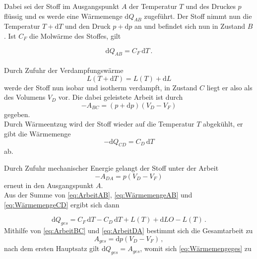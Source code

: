 Dabei sei der Stoff im Ausgangspunkt $A$ der Temperatur $T$ und des Druckes $p$ flüssig und es werde eine Wärmemenge $\mathrm{d}Q_{AB}$ zugeführt.
Der Stoff nimmt nun die Temperatur $T + \mathrm{d}T$ und den Druck $p + \mathrm{d}p$ an und befindet sich nun in Zustand $B$.
Ist $C_F$ die Molwärme des Stoffes, gilt

\begin{equation}
    \mathrm{d}Q_{AB} = C_F \, \mathrm{d}T \,.
    \label{eq:ArbeitAB}
\end{equation}\\

Durch Zufuhr der Verdampfungswärme
\begin{equation}
    L(T + \mathrm{d}T) = L(T) + \mathrm{d}L
    \label{eq:WärmemengeAB}
\end{equation}
werde der Stoff nun isobar und isotherm verdampft, in Zustand $C$ liegt er also als des Volumens $V_D$ vor.
Die dabei geleistete Arbeit ist durch
\begin{equation}
    -A_{BC} = (p + \mathrm{d}p)(V_D - V_F)
    \label{eq:ArbeitBC}
\end{equation}
gegeben. \\

Durch Wärmeentzug wird der Stoff wieder auf die Temperatur $T$ abgekühlt, er gibt die Wärmemenge
\begin{equation}
    -\mathrm{d}Q_{CD} = C_D \,\mathrm{d}T
    \label{eq:WärmemengeCD}
\end{equation}
ab.

Durch Zufuhr mechanischer Energie gelangt der Stoff unter der Arbeit
\begin{equation}
    -A_{DA} = p (V_D - V_F)
    \label{eq:ArbeitDA}
\end{equation} 
erneut in den Ausgangspunkt $A$. \\

Aus der Summe von \eqref{eq:ArbeitAB}, \eqref{eq:WärmemengeAB} und \eqref{eq:WärmemengeCD} ergibt sich dann

\begin{equation}
    \mathrm{d}Q_{ges} = C_F \, \mathrm{d}T - C_D \, \mathrm{d}T + L(T) + \mathrm{d}LO - L(T) \,.
    \label{eq:Wärmemengeges}
\end{equation}
Mithilfe von \eqref{eq:ArbeitBC} und \eqref{eq:ArbeitDA} bestimmt sich die Gesamtarbeit zu
\begin{equation}
    A_{ges} = \mathrm{d}p (V_D - V_F) \,,
\end{equation} nach dem ersten Hauptsatz gilt $\mathrm{d}Q_{ges} = A_{ges}$, womit sich \eqref{eq:Wärmemengeges} zu 

